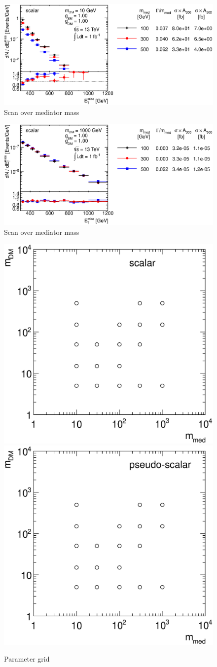 \begin{figure}
\centering
\includegraphics[width=0.9\linewidth]{figures/monojet/scan_mMed_S_10.eps}
\caption{Scan over mediator mass}
\label{fig:monojet_scan_S_mMed}
\end{figure}

\begin{figure}
\centering
\includegraphics[width=0.9\linewidth]{figures/monojet/scan_mMed_S_1000.eps}
\caption{Scan over mediator mass}
\label{fig:monojet_scan_top}
\end{figure}

\begin{figure}
\centering
\includegraphics[width=0.45\linewidth]{figures/monojet/grid_S.eps}
\includegraphics[width=0.45\linewidth]{figures/monojet/grid_P.eps}
\caption{Parameter grid}
\label{fig:monojet_grid_S}
\end{figure}


